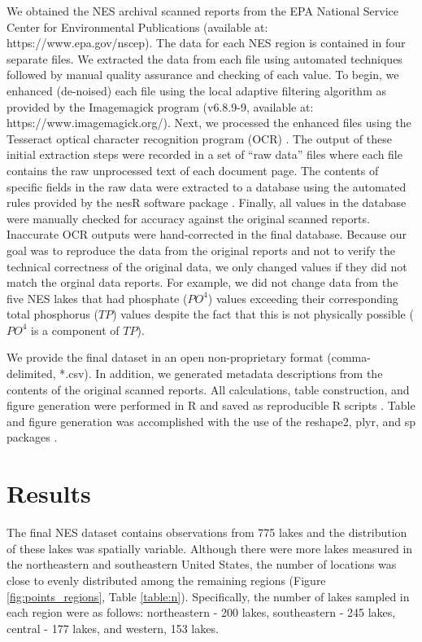 \documentclass[journal abbreviations, manuscript]{copernicus}
\begin{document}
We obtained the NES archival scanned reports from the EPA National Service Center for Environmental Publications (available at: https://www.epa.gov/nscep). The data for each NES region is contained in four separate files. We extracted the data from each file using automated techniques followed by manual quality assurance and checking of each value. To begin, we enhanced (de-noised) each file using the local adaptive filtering algorithm as provided by the Imagemagick program (v6.8.9-9, available at: https://www.imagemagick.org/). Next, we processed the enhanced files using the Tesseract optical character recognition program (OCR) \citep{R-tesseract, smith2007overview}. The output of these initial extraction steps were recorded in a set of “raw data” files where each file contains the raw unprocessed text of each document page. The contents of specific fields in the raw data were extracted to a database using the automated rules provided by the nesR software package \citep{R-nesR}. Finally, all values in the database were manually checked for accuracy against the original scanned reports. Inaccurate OCR outputs were hand-corrected in the final database. Because our goal was to reproduce the data from the original reports and not to verify the technical correctness of the original data, we only changed values if they did not match the orginal data reports. For example, we did not change data from the five NES lakes that had phosphate ($PO^4$) values exceeding their corresponding total phosphorus ($TP$) values despite the fact that this is not physically possible ($PO^4$ is a component of $TP$). 

We provide the final dataset in an open non-proprietary format (comma-delimited, *.csv). In addition, we generated metadata descriptions from the contents of the original scanned reports. All calculations, table construction, and figure generation were performed in R and saved as reproducible R scripts \citep{R-core}. Table and figure generation was accomplished with the use of the reshape2, plyr, and sp packages \citep{R-plyr,R-sp}.

\section{Results}

The final NES dataset contains observations from 775 lakes and the distribution of these lakes was spatially variable. Although there were more lakes measured in the northeastern and southeastern United States, the number of locations was close to evenly distributed among the remaining regions (Figure \ref{fig:points_regions}, Table \ref{table:n}). Specifically, the number of lakes sampled in each region were as follows: northeastern - 200 lakes, southeastern - 245 lakes, central - 177 lakes, and western, 153 lakes. 
\end{document}
